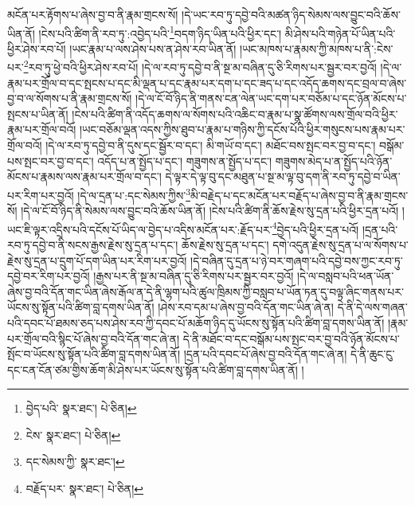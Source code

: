 མངོན་པར་རྟོགས་པ་ཞེས་བྱ་བ་ནི་རྣམ་གྲངས་སོ། །དེ་ཡང་རབ་ཏུ་དབྱེ་བའི་མཚན་ཉིད་སེམས་ལས་བྱུང་བའི་ཆོས་ཡིན་ནོ། །ངེས་པའི་ཚིག་ནི་རབ་ཏུ་:འབྱེད་པའི་\footnote{བྱེད་པའི་  སྣར་ཐང་།  པེ་ཅིན། }བདག་ཉིད་ཡིན་པའི་ཕྱིར་དང་། མི་ཤེས་པའི་གཉེན་པོ་ཡིན་པའི་ཕྱིར་ཤེས་རབ་པོ། །ཡང་རྣམ་པ་ལས་ཤེས་པས་ན་ཤེས་རབ་ཡིན་ནོ། །ཡང་མཁས་པ་རྣམས་ཀྱི་མཁས་པ་ནི་:ངེས་པར་\footnote{ངེས་  སྣར་ཐང་།  པེ་ཅིན། }རབ་ཏུ་ཕྱེ་བའི་ཕྱིར་ཤེས་རབ་པོ། །དེ་ལ་རབ་ཏུ་དབྱེ་བ་ནི་སྔ་མ་བཞིན་དུ་ཅི་རིགས་པར་སྦྱར་བར་བྱའོ། །དེ་ལ་རྣམ་པར་གྲོལ་བ་དང་སྤངས་པ་དང་མི་ལྡན་པ་དང་རྣམ་པར་དག་པ་དང་ཟད་པ་དང་འདོད་ཆགས་དང་བྲལ་བ་ཞེས་བྱ་བ་ལ་སོགས་པ་ནི་རྣམ་གྲངས་སོ། །དེ་ལ་ངོ་བོ་ཉིད་ནི་གནས་ངན་ལེན་ཡང་དག་པར་བཅོམ་པ་དང་ཉོན་མོངས་པ་སྤངས་པ་ཡིན་ནོ། །ངེས་པའི་ཚིག་ནི་འདོད་ཆགས་ལ་སོགས་པའི་འཆིང་བ་རྣམ་པ་སྣ་ཚོགས་ལས་གྲོལ་བའི་ཕྱིར་རྣམ་པར་གྲོལ་བའོ། །ཡང་བཅོམ་ལྡན་འདས་ཀྱིས་ཐུབ་པ་རྣམ་པ་གཉིས་ཀྱི་དངོས་པོའི་ཕྱིར་གསུངས་པས་རྣམ་པར་གྲོལ་བའོ། །དེ་ལ་རབ་ཏུ་དབྱེ་བ་ནི་དུས་དང་སྦྱོར་བ་དང་། མི་གཡོ་བ་དང་། མཐོང་བས་སྤང་བར་བྱ་བ་དང་། བསྒོམ་པས་སྤང་བར་བྱ་བ་དང་། འདོད་པ་ན་སྤྱོད་པ་དང་། གཟུགས་ན་སྤྱོད་པ་དང་། གཟུགས་མེད་པ་ན་སྤྱོད་པའི་ཉོན་མོངས་པ་རྣམས་ལས་རྣམ་པར་གྲོལ་བ་དང་། དེ་ལྟར་དེ་ལྟ་བུ་དང་མཐུན་པ་སྔ་མ་ལྟ་བུ་དག་ནི་རབ་ཏུ་དབྱེ་བ་ཡིན་པར་རིག་པར་བྱའོ། །དེ་ལ་དྲན་པ་:དང་སེམས་ཀྱིས་\footnote{དང་སེམས་ཀྱི་  སྣར་ཐང་། }མི་བརྗེད་པ་དང་མངོན་པར་བརྗོད་པ་ཞེས་བྱ་བ་ནི་རྣམ་གྲངས་སོ། །དེ་ལ་ངོ་བོ་ཉིད་ནི་སེམས་ལས་བྱུང་བའི་ཆོས་ཡིན་ནོ། །ངེས་པའི་ཚིག་ནི་ཆོས་རྗེས་སུ་དྲན་པའི་ཕྱིར་དྲན་པའོ། །ཡང་ཇི་ལྟར་འདྲིས་པའི་དངོས་པོ་ཡིད་ལ་བྱེད་པ་འདིས་མངོན་པར་:རྗོད་པར་\footnote{བརྗོད་པར་  སྣར་ཐང་།  པེ་ཅིན། }བྱེད་པའི་ཕྱིར་དྲན་པའོ། །དྲན་པའི་རབ་ཏུ་དབྱེ་བ་ནི་སངས་རྒྱས་རྗེས་སུ་དྲན་པ་དང་། ཆོས་རྗེས་སུ་དྲན་པ་དང་། དགེ་འདུན་རྗེས་སུ་དྲན་པ་ལ་སོགས་པ་རྗེས་སུ་དྲན་པ་དྲུག་པོ་དག་ཡིན་པར་རིག་པར་བྱའོ། །དེ་བཞིན་དུ་དྲན་པ་ཉེ་བར་གཞག་པའི་དབྱེ་བས་ཀྱང་རབ་ཏུ་དབྱེ་བར་རིག་པར་བྱའོ། །རྒྱས་པར་ནི་སྔ་མ་བཞིན་དུ་ཅི་རིགས་པར་སྦྱར་བར་བྱའོ། །དེ་ལ་བསླབ་པའི་ཕན་ཡོན་ཞེས་བྱ་བའི་དོན་གང་ཡིན་ཞེས་རྒོལ་ན་དེ་ནི་ལྷག་པའི་ཚུལ་ཁྲིམས་ཀྱི་བསླབ་པ་ཡོན་ཏན་དུ་བལྟ་ཞིང་གནས་པར་ཡོངས་སུ་སྟོན་པའི་ཚིག་བླ་དགས་ཡིན་ནོ། །ཤེས་རབ་དམ་པ་ཞེས་བྱ་བའི་དོན་གང་ཡིན་ཞེ་ན། དེ་ནི་དེ་ལས་གཞན་པའི་དབང་པོ་ཐམས་ཅད་པས་ཤེས་རབ་ཀྱི་དབང་པོ་མཆོག་ཉིད་དུ་ཡོངས་སུ་སྟོན་པའི་ཚིག་བླ་དགས་ཡིན་ནོ། །རྣམ་པར་གྲོལ་བའི་སྙིང་པོ་ཞེས་བྱ་བའི་དོན་གང་ཞེ་ན། དེ་ནི་མཐོང་བ་དང་བསྒོམ་པས་སྤང་བར་བྱ་བའི་ཉོན་མོངས་པ་སྤོང་བ་ཡོངས་སུ་སྟོན་པའི་ཚིག་བླ་དགས་ཡིན་ནོ། །དྲན་པའི་དབང་པོ་ཞེས་བྱ་བའི་དོན་གང་ཞེ་ན། དེ་ནི་ཆུང་ངུ་དང་ངན་ངོན་ཙམ་གྱིས་ཆོག་མི་ཤེས་པར་ཡོངས་སུ་སྟོན་པའི་ཚིག་བླ་དགས་ཡིན་ནོ། །
